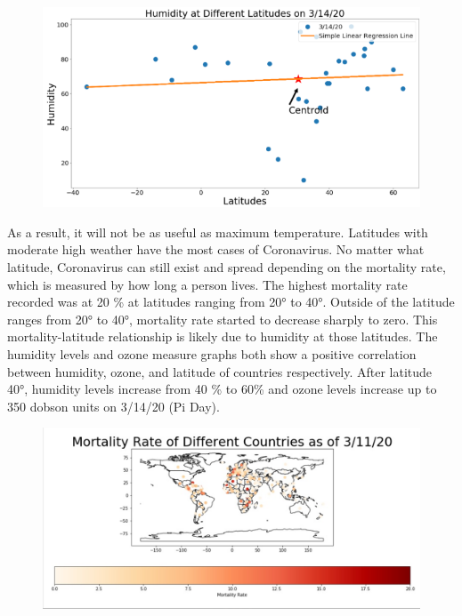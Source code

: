 \documentclass[10pt,journal,compsoc]{IEEEtran}
\begin{document}
{{\begin{figure}[!htbp] %
	\includegraphics[scale=0.6]{humidity-mar-centroid.png}\\
	\centering
	\label{LP-COVID-Humidity March 14th}
\end{figure}

\clearpage

	As a result, it will not be as useful as maximum temperature. Latitudes with moderate high weather have the most cases of Coronavirus. No matter what latitude, Coronavirus can still exist and spread depending on the mortality rate, which is measured by how long a person lives. The highest mortality rate recorded was at 20 \% at latitudes ranging from 20° to 40°. Outside of the latitude ranges from 20° to 40°, mortality rate started to decrease sharply to zero. This mortality-latitude relationship is likely due to humidity at those latitudes. The humidity levels and ozone measure graphs both show a positive correlation between humidity, ozone, and latitude of countries respectively. After latitude 40°, humidity levels increase from 40 \% to 60\% and ozone levels increase up to 350 dobson units on 3/14/20 (Pi Day).

\begin{figure}[!htbp] %
	\includegraphics[scale=0.19]{mortality-mar-11.png}\\
	\centering
	\label{LP-COVID-Mortality Rate March 11th}
\end{figure}

}}
\end{document}
